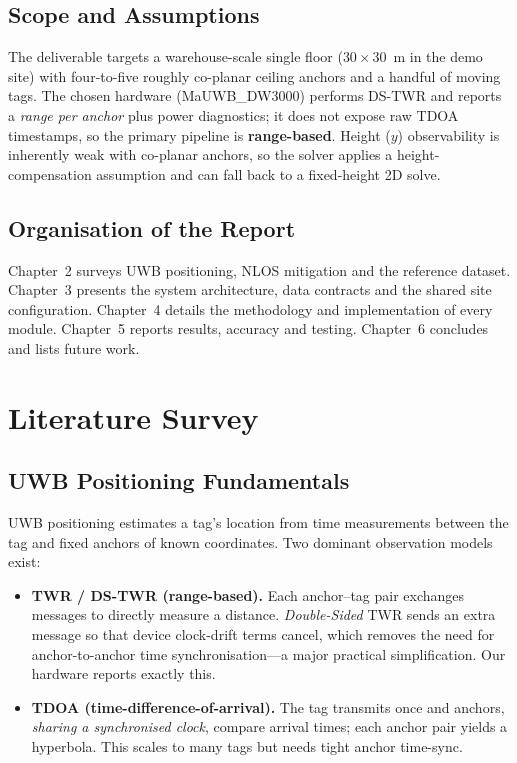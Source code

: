 \documentclass[a4paper,12pt,onecolumn]{report}
\begin{document}
\section{Scope and Assumptions}
The deliverable targets a warehouse-scale single floor ($30\times30$~m in the
demo site) with four-to-five roughly co-planar ceiling anchors and a handful of
moving tags. The chosen hardware (MaUWB\_DW3000) performs DS-TWR and reports a
\emph{range per anchor} plus power diagnostics; it does not expose raw TDOA
timestamps, so the primary pipeline is \textbf{range-based}. Height ($y$)
observability is inherently weak with co-planar anchors, so the solver applies a
height-compensation assumption and can fall back to a fixed-height 2D solve.

\section{Organisation of the Report}
Chapter~2 surveys UWB positioning, NLOS mitigation and the reference dataset.
Chapter~3 presents the system architecture, data contracts and the shared site
configuration. Chapter~4 details the methodology and implementation of every
module. Chapter~5 reports results, accuracy and testing. Chapter~6 concludes and
lists future work.

\chapter{Literature Survey}

\section{UWB Positioning Fundamentals}
UWB positioning estimates a tag's location from time measurements between the
tag and fixed anchors of known coordinates. Two dominant observation models
exist:
\begin{itemize}[nosep]
  \item \textbf{TWR / DS-TWR (range-based).} Each anchor--tag pair exchanges
        messages to directly measure a distance. \emph{Double-Sided} TWR sends
        an extra message so that device clock-drift terms cancel, which removes
        the need for anchor-to-anchor time synchronisation---a major practical
        simplification. Our hardware reports exactly this.
  \item \textbf{TDOA (time-difference-of-arrival).} The tag transmits once and
        anchors, \emph{sharing a synchronised clock}, compare arrival times; each
        anchor pair yields a hyperbola. This scales to many tags but needs tight
        anchor time-sync.
\end{itemize}
\end{document}
